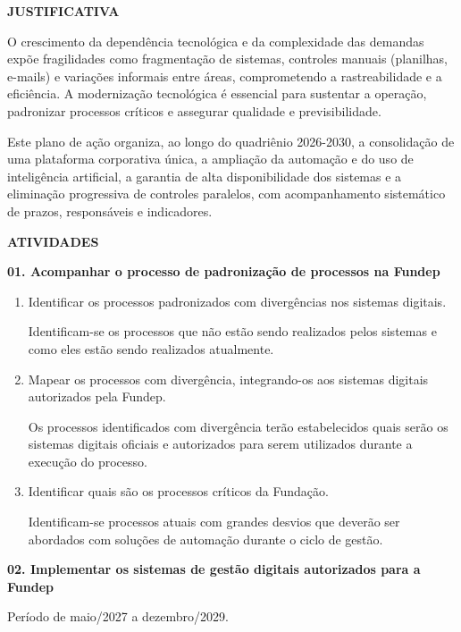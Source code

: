 \documentclass[12pt,a4paper]{article}
\newcommand{\secao}[1]{%
  \par\vspace{\dimexpr16pt-\parskip\relax}%
  {\noindent\bfseries\color{azulTitulo}\fontsize{13}{16}\selectfont #1}%
  \par\vspace{\dimexpr8pt-\parskip\relax}%
}
\newcommand{\atividade}[1]{%
  \par\vspace{\dimexpr16pt-\parskip\relax}%
  {\bfseries\color{azulAtividade}#1}%
  \par\vspace{\dimexpr8pt-\parskip\relax}%
}
\begin{document}
\secao{JUSTIFICATIVA}

O crescimento da dependência tecnológica e da complexidade das demandas expõe fragilidades como fragmentação de sistemas, controles manuais (planilhas, e-mails) e variações informais entre áreas, comprometendo a rastreabilidade e a eficiência. A modernização tecnológica é essencial para sustentar a operação, padronizar processos críticos e assegurar qualidade e previsibilidade.

Este plano de ação organiza, ao longo do quadriênio 2026-2030, a consolidação de uma plataforma corporativa única, a ampliação da automação e do uso de inteligência artificial, a garantia de alta disponibilidade dos sistemas e a eliminação progressiva de controles paralelos, com acompanhamento sistemático de prazos, responsáveis e indicadores.

\secao{ATIVIDADES}

\atividade{01. Acompanhar o processo de padronização de processos na Fundep}

\begin{enumerate}
  \item Identificar os processos padronizados com divergências nos sistemas digitais.

        Identificam-se os processos que não estão sendo realizados pelos sistemas e como eles estão sendo realizados atualmente.
  \item Mapear os processos com divergência, integrando-os aos sistemas digitais autorizados pela Fundep.

        Os processos identificados com divergência terão estabelecidos quais serão os sistemas digitais oficiais e autorizados para serem utilizados durante a execução do processo.
  \item Identificar quais são os processos críticos da Fundação.

        Identificam-se processos atuais com grandes desvios que deverão ser abordados com soluções de automação durante o ciclo de gestão.
\end{enumerate}

\atividade{02. Implementar os sistemas de gestão digitais autorizados para a Fundep}

Período de maio/2027 a dezembro/2029.
\end{document}

